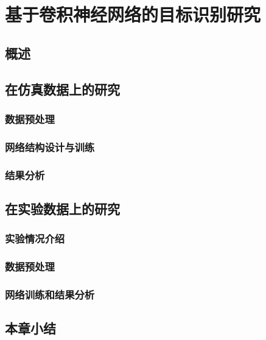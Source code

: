 \chapter{基于卷积神经网络的目标识别研究}
\section{概述}
\section{在仿真数据上的研究}
\subsection{数据预处理}
\subsection{网络结构设计与训练}
\subsection{结果分析}
\section{在实验数据上的研究}
\subsection{实验情况介绍}
\subsection{数据预处理}
\subsection{网络训练和结果分析}
\section{本章小结}
